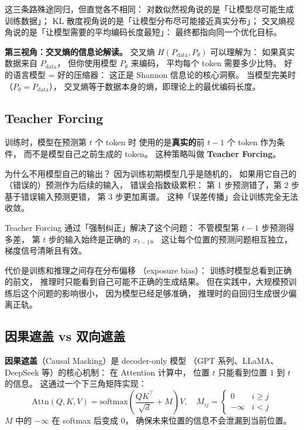 这三条路殊途同归，但直觉各不相同：
对数似然视角说的是「让模型尽可能生成训练数据」；
KL 散度视角说的是「让模型分布尽可能接近真实分布」；
交叉熵视角说的是「让模型需要的平均编码长度最短」：
最终都指向同一个优化目标。

\textbf{第三视角：交叉熵的信息论解读。}
交叉熵 $H(P_{\mathrm{data}}, P_\theta)$ 可以理解为：
如果真实数据来自 $P_{\mathrm{data}}$，
但你使用模型 $P_\theta$ 来编码，
平均每个 token 需要多少比特。
好的语言模型 = 好的压缩器：
这正是 Shannon 信息论的核心洞察。
当模型完美时（$P_\theta = P_{\mathrm{data}}$），
交叉熵等于数据本身的熵，即理论上的最优编码长度。

\subsection{Teacher Forcing}

训练时，模型在预测第 $t$ 个 token 时
使用的是\textbf{真实的}前 $t-1$ 个 token 作为条件，
而不是模型自己之前生成的 token。
这种策略叫做 \textbf{Teacher Forcing}。

为什么不用模型自己的输出？
因为训练初期模型几乎是随机的，
如果用它自己的（错误的）预测作为后续的输入，
错误会指数级累积：
第 1 步预测错了，第 2 步基于错误输入预测更错，
第 3 步更加离谱。
这种「误差传播」会让训练完全无法收敛。

Teacher Forcing 通过「强制纠正」解决了这个问题：
不管模型第 $t-1$ 步预测得多差，
第 $t$ 步的输入始终是正确的 $x_{t-1}$。
这让每个位置的预测问题相互独立，
梯度信号清晰且有效。

代价是训练和推理之间存在分布偏移
（exposure bias）：
训练时模型总看到正确的前文，
推理时只能看到自己可能不正确的生成结果。
但在实践中，大规模预训练后这个问题的影响很小，
因为模型已经足够准确，
推理时的自回归生成很少偏离正轨。

\subsection{因果遮盖 vs 双向遮盖}

\textbf{因果遮盖}（Causal Masking）是 decoder-only 模型
（GPT 系列、LLaMA、DeepSeek 等）的核心机制：
在 Attention 计算中，
位置 $t$ 只能看到位置 $1$ 到 $t$ 的信息。
这通过一个下三角矩阵实现：
\begin{equation}
  \mathrm{Attn}(Q, K, V) = \mathrm{softmax}\left(
    \frac{QK^\top}{\sqrt{d}} + M
  \right) V, \quad
  M_{ij} = \begin{cases} 0 & i \geq j \\ -\infty & i < j \end{cases}
\end{equation}
$M$ 中的 $-\infty$ 在 softmax 后变成 0，
确保未来位置的信息不会泄漏到当前位置。

